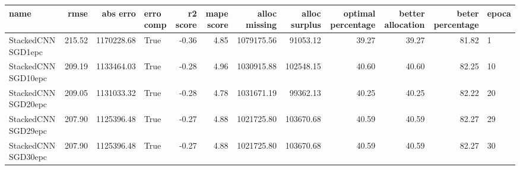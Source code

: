\begin{tabular}{lrrlrrrrrrrl}
\toprule
name & rmse & abs erro & erro comp & r2 score & mape score & alloc missing & alloc surplus & optimal percentage & better allocation & beter percentage & epoca \\
\midrule
StackedCNN SGD1epc & 215.52 & 1170228.68 & True & -0.36 & 4.85 & 1079175.56 & 91053.12 & 39.27 & 39.27 & 81.82 & 1 \\
StackedCNN SGD10epc & 209.19 & 1133464.03 & True & -0.28 & 4.96 & 1030915.88 & 102548.15 & 40.60 & 40.60 & 82.25 & 10 \\
StackedCNN SGD20epc & 209.05 & 1131033.32 & True & -0.28 & 4.78 & 1031671.19 & 99362.13 & 40.25 & 40.25 & 82.22 & 20 \\
StackedCNN SGD29epc & 207.90 & 1125396.48 & True & -0.27 & 4.88 & 1021725.80 & 103670.68 & 40.59 & 40.59 & 82.27 & 29 \\
StackedCNN SGD30epc & 207.90 & 1125396.48 & True & -0.27 & 4.88 & 1021725.80 & 103670.68 & 40.59 & 40.59 & 82.27 & 30 \\
\bottomrule
\end{tabular}
